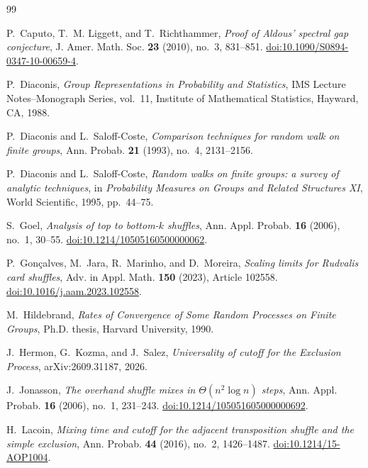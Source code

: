 \documentclass[11pt]{article}
\theoremstyle{remark}
\begin{document}
\begin{thebibliography}{99}
\small

P.~Caputo, T.~M. Liggett, and T.~Richthammer,
\emph{Proof of Aldous' spectral gap conjecture},
J. Amer. Math. Soc. \textbf{23} (2010), no.~3, 831--851.
\href{https://doi.org/10.1090/S0894-0347-10-00659-4}{doi:10.1090/S0894-0347-10-00659-4}.

P.~Diaconis,
\emph{Group Representations in Probability and Statistics},
IMS Lecture Notes--Monograph Series, vol.~11,
Institute of Mathematical Statistics, Hayward, CA, 1988.

P.~Diaconis and L.~Saloff-Coste,
\emph{Comparison techniques for random walk on finite groups},
Ann. Probab. \textbf{21} (1993), no.~4, 2131--2156.

P.~Diaconis and L.~Saloff-Coste,
\emph{Random walks on finite groups: a survey of analytic techniques},
in \emph{Probability Measures on Groups and Related Structures XI},
World Scientific, 1995, pp.~44--75.

S.~Goel,
\emph{Analysis of top to bottom-$k$ shuffles},
Ann. Appl. Probab. \textbf{16} (2006), no.~1, 30--55.
\href{https://doi.org/10.1214/10505160500000062}{doi:10.1214/10505160500000062}.

P.~Gon\c{c}alves, M.~Jara, R.~Marinho, and D.~Moreira,
\emph{Scaling limits for Rudvalis card shuffles},
Adv. in Appl. Math. \textbf{150} (2023), Article 102558.
\href{https://doi.org/10.1016/j.aam.2023.102558}{doi:10.1016/j.aam.2023.102558}.

M.~Hildebrand,
\emph{Rates of Convergence of Some Random Processes on Finite Groups},
Ph.D. thesis, Harvard University, 1990.

J.~Hermon, G.~Kozma, and J.~Salez,
\emph{Universality of cutoff for the Exclusion Process},
arXiv:2609.31187, 2026.

J.~Jonasson,
\emph{The overhand shuffle mixes in $\Theta(n^2\log n)$ steps},
Ann. Appl. Probab. \textbf{16} (2006), no.~1, 231--243.
\href{https://doi.org/10.1214/105051605000000692}{doi:10.1214/105051605000000692}.

H.~Lacoin,
\emph{Mixing time and cutoff for the adjacent transposition shuffle and the simple exclusion},
Ann. Probab. \textbf{44} (2016), no.~2, 1426--1487.
\href{https://doi.org/10.1214/15-AOP1004}{doi:10.1214/15-AOP1004}.


\end{thebibliography}
\end{document}
